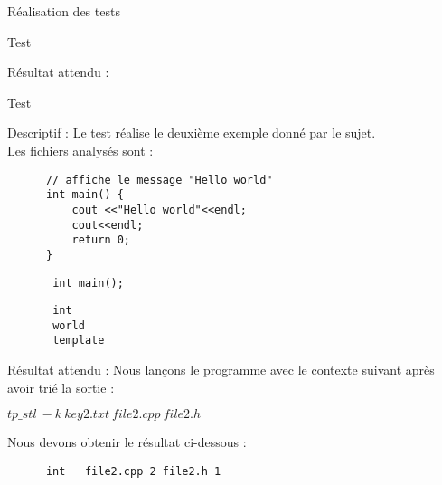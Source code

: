 \documentclass{article}
\begin{document}
\begin{section}{Réalisation des tests}
\begin{subsection}{Test }
\begin{paragraph}{Résultat attendu :}
\begin{listing}[h!]
      \end{listing}
    \end{paragraph}

 \end{subsection}
     
   \newpage 
       
  \begin{subsection}{Test }
  
    \begin{paragraph}{Descriptif :}
	Le test  réalise le deuxième exemple donné par le sujet.\\ Les fichiers analysés sont : 
      
      \begin{listing}[h!]
      \begin{verbatim}
	  // affiche le message "Hello world"
	  int main() {
	      cout <<"Hello world"<<endl;
	      cout<<endl;
	      return 0;
	  }
      \end{verbatim}
      \end{listing}
      
      \begin{listing}[h!]
	\begin{verbatim}
	   int main();
	\end{verbatim}
      \end{listing}
      
        \begin{listing}[h!]
	\begin{verbatim}
	   int
	   world
	   template
	\end{verbatim}
      \end{listing}
      
    \end{paragraph}
	   
    \begin{paragraph}{Résultat attendu :}
       Nous lançons le programme avec le contexte suivant après avoir trié la sortie :  
       \begin{center}
	\textbf{$tp\_stl\ -k\ key2.txt\ file2.cpp\ file2.h$}
      \end{center}
      
      Nous devons obtenir le résultat ci-dessous : 
      \begin{listing}[h!]
      \begin{verbatim}
	  int	file2.cpp 2	file2.h 1	
      \end{verbatim}
  

\end{listing}
\end{paragraph}
\end{subsection}
\end{section}
\end{document}
